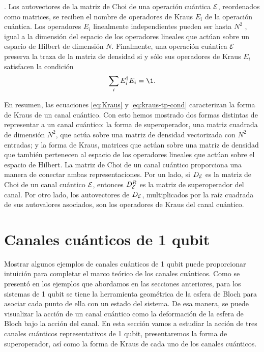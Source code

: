 \cite{bengtsson_zyczkowski_2017}.
Los autovectores de la matriz de Choi de una operación cuántica $\mathcal{E}$,
reordenados como matrices, se
reciben el nombre de operadores de Kraus $E_i$ de la operación cuántica.
Los operadores $E_i$ linealmente independientes  
pueden ser hasta $N^2$ \cite{nielsen_chuang_2011}, igual a la dimensión 
del espacio de los operadores lineales que actúan sobre un espacio de
Hilbert de dimensión $N$. 
Finalmente, una operación cuántica $\mathcal{E}$ preserva la traza de la matriz de densidad 
si y sólo sus operadores de Kraus $E_i$ satisfacen la condición
\cite{bengtsson_zyczkowski_2017}
\begin{align}
\sum_iE_i^{\dagger}E_i=\1.
\label{eq:kraus-tp-cond}
\end{align}

En resumen, las ecuaciones \eqref{eq:Kraus} y \eqref{eq:kraus-tp-cond}
caracterizan la forma de Kraus de un canal cuántico. 
Con esto hemos mostrado dos formas distintas de representar a un 
canal cuántico: la forma de superoperador, una matriz cuadrada
de dimensión $N^2$, que actúa sobre una matriz de densidad vectorizada 
con $N^2$ entradas; y la forma de Kraus, matrices que actúan sobre
una matriz de densidad que también pertenecen al espacio de 
los operadores lineales que actúan sobre el espacio de Hilbert. La matriz de 
Choi de un canal cuántico proporciona una manera de conectar ambas 
representaciones. Por un lado, si $D_{\mathcal{E}}$ es la matriz de Choi de un canal 
cuántico $\mathcal{E}$, entonces $D_{\mathcal{E}}^R$ es la matriz de superoperador
del canal.
Por otro lado, los autovectores de $D_{\mathcal{E}}$,
multiplicados por la raíz cuadrada de sus autovalores asociados,
son los operadores de Kraus del canal cuántico. 

\section{Canales cuánticos de 1 qubit} %

Mostrar algunos ejemplos de canales cuánticos de 1 qubit 
puede proporcionar intuición 
para completar el marco teórico de los canales cuánticos. 
Como se presentó en los ejemplos que abordamos en las 
secciones anteriores, para los sistemas de 1 qubit se tiene la
herramienta geométrica de la esfera de Bloch para asociar cada 
punto de ella con un estado del sistema. De esa manera, 
se puede visualizar la acción de un canal cuántico como la 
deformación de la esfera de Bloch bajo la acción del canal.
En esta sección vamos a estudiar la acción de tres canales 
cuánticos representativos de 1 qubit, presentaremos
la forma de superoperador, así como la forma de Kraus de 
cada uno de los canales cuánticos.

